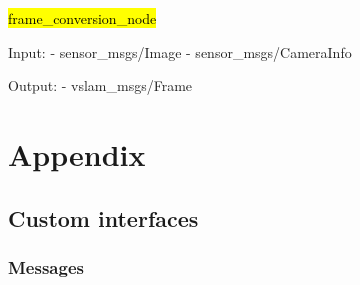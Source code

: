 \hl{frame\_conversion\_node}

Input: 
- sensor\_msgs/Image
- sensor\_msgs/CameraInfo

Output:
- vslam\_msgs/Frame


\section{Appendix}

\subsection{Custom interfaces}

\subsubsection{Messages}

